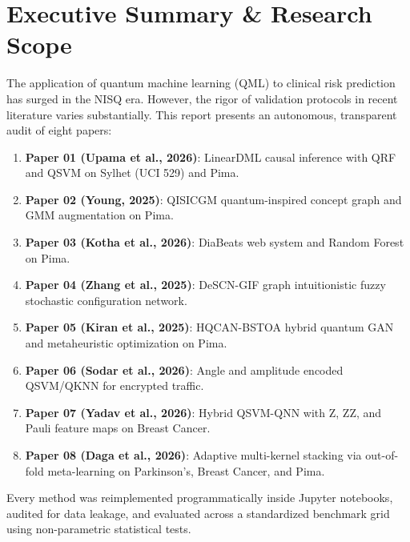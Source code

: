 \documentclass[11pt,a4paper]{article}
\begin{document}
\section{Executive Summary \& Research Scope}
The application of quantum machine learning (QML) to clinical risk prediction has surged in the NISQ era. However, the rigor of validation protocols in recent literature varies substantially. This report presents an autonomous, transparent audit of eight papers:
\begin{enumerate}[leftmargin=*]
  \item \textbf{Paper 01 (Upama et al., 2026)}: LinearDML causal inference with QRF and QSVM on Sylhet (UCI 529) and Pima.
  \item \textbf{Paper 02 (Young, 2025)}: QISICGM quantum-inspired concept graph and GMM augmentation on Pima.
  \item \textbf{Paper 03 (Kotha et al., 2026)}: DiaBeats web system and Random Forest on Pima.
  \item \textbf{Paper 04 (Zhang et al., 2025)}: DeSCN-GIF graph intuitionistic fuzzy stochastic configuration network.
  \item \textbf{Paper 05 (Kiran et al., 2025)}: HQCAN-BSTOA hybrid quantum GAN and metaheuristic optimization on Pima.
  \item \textbf{Paper 06 (Sodar et al., 2026)}: Angle and amplitude encoded QSVM/QKNN for encrypted traffic.
  \item \textbf{Paper 07 (Yadav et al., 2026)}: Hybrid QSVM-QNN with Z, ZZ, and Pauli feature maps on Breast Cancer.
  \item \textbf{Paper 08 (Daga et al., 2026)}: Adaptive multi-kernel stacking via out-of-fold meta-learning on Parkinson's, Breast Cancer, and Pima.
\end{enumerate}

Every method was reimplemented programmatically inside Jupyter notebooks, audited for data leakage, and evaluated across a standardized benchmark grid using non-parametric statistical tests.

\end{document}
